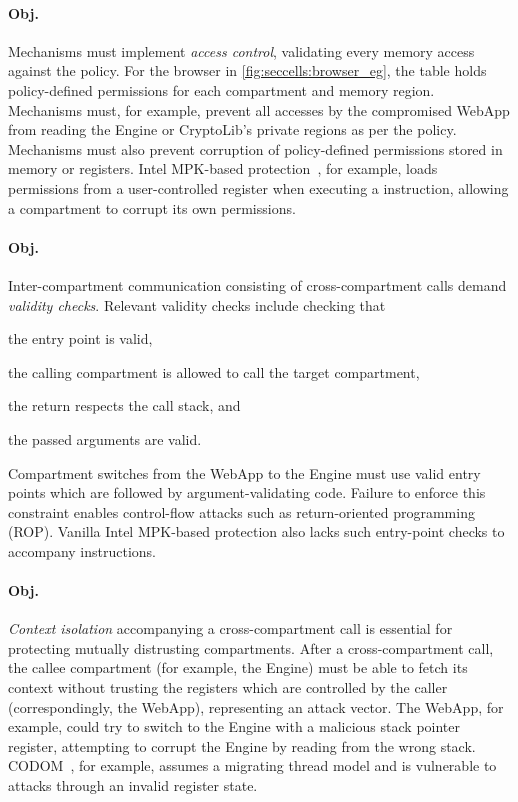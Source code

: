 \paragraph{Obj. }
Mechanisms must implement \emph{access control},
validating every memory access against the policy.
For the browser in \autoref{fig:seccells:browser_eg}, the table
holds policy-defined permissions for each compartment and memory region.
Mechanisms must, for example, prevent all accesses by the compromised
WebApp from reading the Engine or CryptoLib's private regions as per the
policy.
Mechanisms must also prevent corruption of policy-defined permissions
stored in memory or registers.
Intel MPK-based protection~\cite{ParkLXMK19}, for example, loads
permissions from a user-controlled register when executing a
 instruction, allowing a compartment to corrupt its 
own permissions.

\paragraph{Obj. }
Inter-compartment communication consisting of cross-compartment calls 
demand \emph{validity checks}.
Relevant validity checks include checking that 
\begin{inparaenum}
  \item the entry point is valid,
  \item the calling compartment is allowed to call the target compartment, 
  \item the return respects the call stack, and
  \item the passed arguments are valid.
\end{inparaenum}
Compartment switches from the WebApp to the Engine must use valid entry
points which are followed by argument-validating code. Failure to enforce this
constraint enables
control-flow attacks such as return-oriented programming (ROP).
Vanilla Intel MPK-based protection also lacks such entry-point checks
to accompany  instructions.

\paragraph{Obj. }
\emph{Context isolation} accompanying a cross-compartment call is 
essential for protecting mutually distrusting compartments.
After a cross-compartment call, the callee compartment (for example, the Engine) 
must be able to fetch its context without trusting the registers which
are controlled by the caller (correspondingly, the WebApp), 
representing an attack vector.
The WebApp, for example, could try to switch to the Engine with a malicious stack pointer
register, attempting to corrupt the Engine by reading from the wrong stack.
CODOM~\cite{VilanovaBNEV14}, for example, assumes a migrating thread model
and is vulnerable to attacks through an invalid register state.

